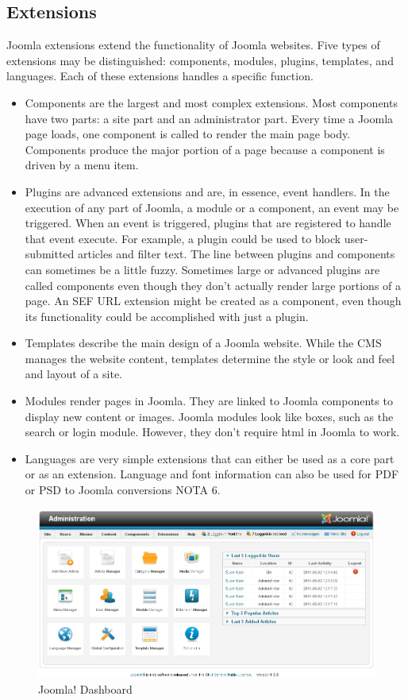 \subsection{Extensions}
\label{subsec:joomla_ext}
Joomla extensions extend the functionality of Joomla websites. Five types of extensions may be distinguished: components, modules, plugins, templates, and languages. Each of these extensions handles a specific function.
\begin{itemize}
	\item Components are the largest and most complex extensions. Most components have two parts: a site part and an administrator part. Every time a Joomla page loads, one component is called to render the main page body. Components produce the major portion of a page because a component is driven by a menu item.
	\item Plugins are advanced extensions and are, in essence, event handlers. In the execution of any part of Joomla, a module or a component, an event may be triggered. When an event is triggered, plugins that are registered to handle that event execute. For example, a plugin could be used to block user-submitted articles and filter text. The line between plugins and components can sometimes be a little fuzzy. Sometimes large or advanced plugins are called components even though they don't actually render large portions of a page. An SEF URL extension might be created as a component, even though its functionality could be accomplished with just a plugin.
	\item Templates describe the main design of a Joomla website. While the CMS manages the website content, templates determine the style or look and feel and layout of a site.
	\item Modules render pages in Joomla. They are linked to Joomla components to display new content or images. Joomla modules look like boxes, such as the search or login module. However, they don’t require html in Joomla to work.
	\item Languages are very simple extensions that can either be used as a core part or as an extension. Language and font information can also be used for PDF or PSD to Joomla conversions NOTA 6. 
\end{itemize}




\begin {figure}[h]
\graphicspath{{images/chapter_cms/}}
\includegraphics[width=\textwidth]{joomla_dash}
\caption{Joomla! Dashboard}
\end {figure}
